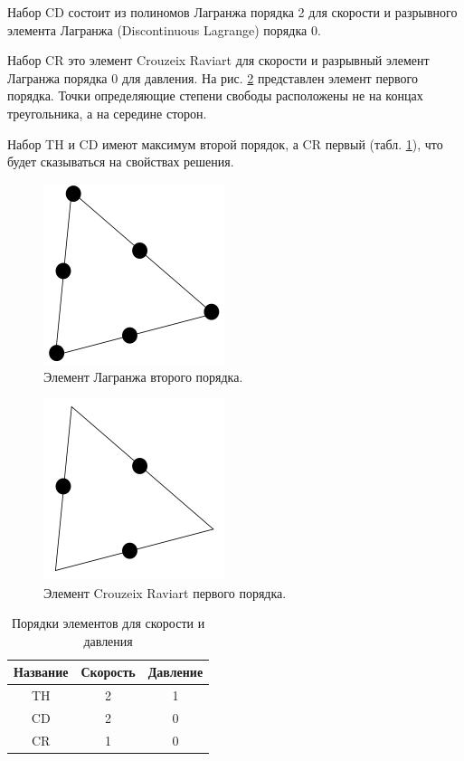 \documentclass[12pt]{article}
\begin{document}
Набор CD состоит из полиномов Лагранжа порядка 2 для скорости и разрывного элемента Лагранжа (Discontinuous Lagrange) порядка 0.

Набор CR это элемент Crouzeix Raviart для скорости и разрывный элемент Лагранжа порядка 0 для давления. На рис. \ref{fg:crouzeix1} представлен элемент первого порядка. Точки определяющие степени свободы расположены не на концах треугольника, а на середине сторон.

Набор TH и CD имеют максимум второй порядок, а CR первый (табл. \ref{tb:order}), что будет сказываться на свойствах решения.

\begin{figure}
	\begin{center}
		\includegraphics[width=200px]{pics/lagrange2}
		\caption{Элемент Лагранжа второго порядка.}
		\label{fg:lagrange2}
	\end{center}
\end{figure}

\begin{figure}
	\begin{center}
		\includegraphics[width=200px]{pics/crouzeix1}
		\caption{Элемент Crouzeix Raviart первого порядка.}
		\label{fg:crouzeix1}
	\end{center}
\end{figure}

\begin{table}
\begin{center}
\begin{tabular}{|c|c|c|}
\hline
Название & Скорость & Давление \\
\hline
TH & 2 & 1 \\
\hline
CD & 2 & 0 \\
\hline
CR & 1 & 0 \\
\hline
\end{tabular}
\end{center}
\caption{Порядки элементов для скорости и давления}
\label{tb:order}
\end{table}
\end{document}
